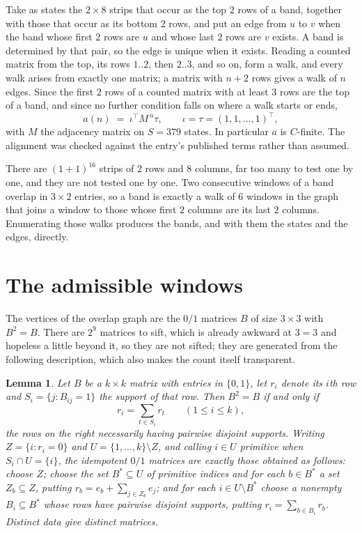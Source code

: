 \documentclass[11pt,a4paper]{article}
\theoremstyle{plain}
\newtheorem{lemma}[theorem]{Lemma}
\theoremstyle{definition}
\begin{document}
Take as states the $2\times8$ strips that occur as the top $2$ rows of a band,
together with those that occur as its bottom $2$ rows, and put an edge from $u$ to $v$
when the band whose first $2$ rows are $u$ and whose last $2$ rows are $v$ exists.
A band is determined by that pair, so the edge is unique when it exists. Reading a counted
matrix from the top, its rows $1..2$, then $2..3$, and so on, form a walk, and every
walk arises from exactly one matrix; a matrix with $n+2$ rows gives a walk of $n$ edges.
Since the first $2$ rows of a counted matrix with at least $3$ rows are the top of a
band, and since no further condition falls on where a walk starts or ends,
\[
a(n)\;=\;\iota^{\!\top}M^{\,n}\tau ,\qquad \iota=\tau=(1,1,\dots,1)^{\!\top},
\]
with $M$ the adjacency matrix on $S=379$ states. In particular $a$ is $C$-finite. The
alignment was checked against the entry's published terms rather than assumed.

There are $(1 + 1)^{16}$ strips of $2$ rows and $8$ columns, far too
many to test one by one, and they are not tested one by one. Two consecutive windows of a band
overlap in $3\times2$ entries, so a band is exactly a walk of $6$ windows in
the graph that joins a window to those whose first $2$ columns are its last $2$
columns. Enumerating those walks produces the bands, and with them the states and the edges,
directly.

\section{The admissible windows}

The vertices of the overlap graph are the $0/1$ matrices $B$ of size $3\times3$ with
$B^2=B$. There are $2^{9}$ matrices to sift, which is already awkward at $3=3$ and
hopeless a little beyond it, so they are not sifted; they are generated from the following
description, which also makes the count itself transparent.

\begin{lemma}\label{lem:idem}
Let $B$ be a $k\times k$ matrix with entries in $\{0,1\}$, let $r_i$ denote its $i$th row and
$S_i=\{j:B_{ij}=1\}$ the support of that row. Then $B^2=B$ if and only if
\[
r_i=\sum_{t\in S_i}r_t \qquad (1\le i\le k),
\]
the rows on the right necessarily having pairwise disjoint supports. Writing
$Z=\{i:r_i=0\}$ and $U=\{1,\dots,k\}\setminus Z$, and calling $i\in U$ \emph{primitive}
when $S_i\cap U=\{i\}$, the idempotent $0/1$ matrices are exactly those obtained as follows:
choose $Z$; choose the set $B^{\ast}\subseteq U$ of primitive indices and for each
$b\in B^{\ast}$ a set $Z_b\subseteq Z$, putting $r_b=e_b+\sum_{j\in Z_b}e_j$; and for each
$i\in U\setminus B^{\ast}$ choose a nonempty $B_i\subseteq B^{\ast}$ whose rows have
pairwise disjoint supports, putting $r_i=\sum_{b\in B_i}r_b$. Distinct data give distinct
matrices.
\end{lemma}
\end{document}
